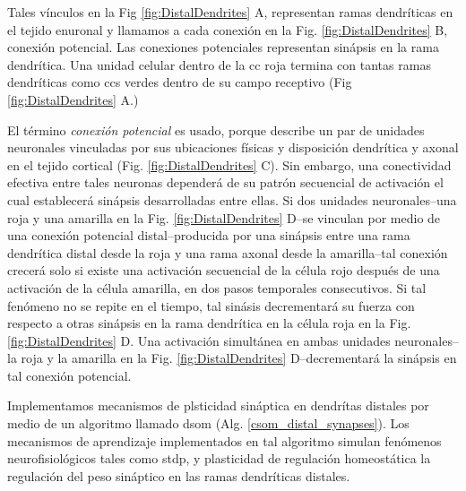 {Tales vínculos en la Fig \ref{fig:DistalDendrites} A, representan ramas dendríticas en el tejido enuronal y
llamamos a cada conexión en la Fig. \ref{fig:DistalDendrites} B, conexión potencial.
Las conexiones potenciales representan sinápsis en la rama dendrítica.
Una unidad celular dentro de la \gls{cc} roja termina con tantas ramas dendríticas como \glspl{cc} verdes dentro de su campo receptivo (Fig \ref{fig:DistalDendrites} A.)

El término \emph{conexión potencial} es usado, porque describe un par de unidades neuronales vinculadas por sus ubicaciones físicas y disposición dendrítica y axonal en el tejido cortical (Fig. \ref{fig:DistalDendrites} C). Sin embargo, una conectividad efectiva entre tales neuronas dependerá de su patrón secuencial de activación el cual establecerá sinápsis desarrolladas entre ellas. 
Si dos unidades neuronales--una roja y una amarilla en la Fig. \ref{fig:DistalDendrites} D--se vinculan por medio de una conexión potencial distal--producida por una sinápsis entre una rama dendrítica distal desde la roja y una rama axonal desde la amarilla--tal conexión crecerá solo si existe una activación secuencial de la célula rojo después de una activación de la célula amarilla, en dos pasos temporales consecutivos.
Si tal fenómeno no se repite en el tiempo, tal sinásis decrementará su fuerza con respecto a otras sinápsis en la rama dendrítica en la célula roja en la Fig. \ref{fig:DistalDendrites} D.
Una activación simultánea en ambas unidades neuronales--la roja y la amarilla en la Fig. \ref{fig:DistalDendrites} D--decrementará la sinápsis en tal conexión potencial.

Implementamos mecanismos de plsticidad sináptica en dendrítas distales por medio de un algoritmo llamado \gls{dsom} (Alg. \ref{csom_distal_synapses}).
Los mecanismos de aprendizaje implementados en tal algoritmo simulan fenómenos neurofisiológicos
tales como \gls{stdp}, y plasticidad de regulación homeostática la regulación del peso sináptico en las ramas dendríticas distales.

}
